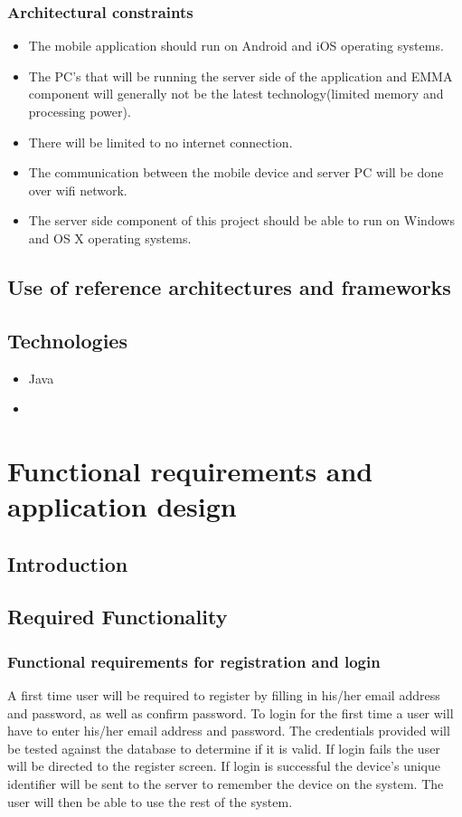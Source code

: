 \documentclass[10pt,a4paper]{article}
\begin{document}
\subsubsection{Architectural constraints}
\begin{itemize}
\item The mobile application should run on Android and iOS operating systems.
\item The PC's that will be running the server side of the application and EMMA component will generally not be the latest technology(limited memory and processing power).
\item There will be limited to no internet connection.
\item The communication between the mobile device and server PC will be done over wifi network.
\item The server side component of this project should be able to run on Windows and OS X operating systems.
\end{itemize}
\subsection{Use of reference architectures and frameworks}
\subsection{Technologies}
\begin{itemize}
\item Java
\item
\end{itemize}
\section{Functional requirements and application design}
\subsection{Introduction}
\subsection{Required Functionality}
\subsubsection{Functional requirements for registration and login}
A first time user will be required to register by filling in his/her email address and password, as well as confirm password.
To login for the first time a user will have to enter his/her email address and password. The credentials provided will be tested against the database to determine if it is valid.  If login fails the user will be directed to the register screen. If login is successful the device's unique identifier will be sent to the server to remember the device on the system. The user will then be able to use the rest of the system.
\end{document}
